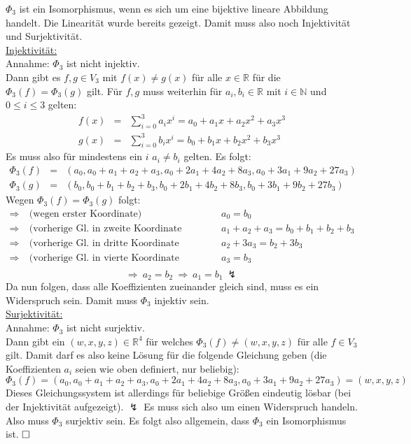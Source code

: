 \documentclass[10pt, a4paper]{article}
\begin{document}
		$\Phi_3$ ist ein Isomorphismus, wenn es sich um eine bijektive lineare Abbildung handelt. Die Linearität wurde bereits gezeigt. Damit muss also noch Injektivität und Surjektivität.\\

		\underline{Injektivität:}\\
		Annahme: $\Phi_3$ ist nicht injektiv.\\
		Dann gibt es $f,g \in V_3$ mit $f(x)\neq g(x)$ für alle $x\in \mathbb{R}$ für die $\Phi_3(f)=\Phi_3(g)$ gilt. Für $f,g$ muss weiterhin für $a_i,b_i \in \mathbb{R}$ mit $i \in \mathbb{N}$ und $0\leq i \leq 3$ gelten:
		\begin{eqnarray*}
			f(x) &=& \sum_{i=0}^3 a_ix^i = a_0 +a_1x +a_2x^2 + a_3x^3 \\	
			g(x) &=& \sum_{i=0}^3 b_ix^i = b_0 +b_1x +b_2x^2 + b_3x^3 
		\end{eqnarray*}
		Es muss also für mindestens ein $i$ $a_i\neq b_i$ gelten. Es folgt:
		\begin{eqnarray*}
			\Phi_3(f) &=& (a_0, a_0+a_1+a_2+a_3, a_0+2a_1+4a_2+8a_3, a_0+3a_1+9a_2+27a_3) \\
			\Phi_3(g) &=& (b_0, b_0+b_1+b_2+b_3, b_0+2b_1+4b_2+8b_3, b_0+3b_1+9b_2+27b_3) 			
		\end{eqnarray*}
		Wegen $\Phi_3(f)=\Phi_3(g)$ folgt:
		\begin{eqnarray*}
			\Rightarrow \ &\text{(wegen erster Koordinate)} & a_0 = b_0 \\
			\Rightarrow \ &\text{(vorherige Gl. in zweite Koordinate eingesetzt)} & a_1+a_2+a_3 = b_0+b_1+b_2+b_3 \\
			\Rightarrow \ &\text{(vorherige Gl. in dritte Koordinate eingesetzt)} & a_2 + 3a_3 = b_2 + 3b_3 \\
			\Rightarrow \ &\text{(vorherige Gl. in vierte Koordinate eingesetzt)} & a_3 = b_3 \\
		\end{eqnarray*}
		\[
			\Rightarrow \ a_2 = b_2 \ \Rightarrow \ a_1 = b_1 \ \lightning
		\]
		Da nun folgen, dass alle Koeffizienten zueinander gleich sind, muss es ein Widerspruch sein. Damit muss $\Phi_3$ injektiv sein.\\

		\underline{Surjektivität:}\\
		Annahme: $\Phi_3$ ist nicht surjektiv.\\
		Dann gibt ein $(w,x,y,z)\in \mathbb{R}^4$ für welches $\Phi_3(f) \neq (w,x,y,z)$ für alle $f \in V_3$ gilt. Damit darf es also keine Lösung für die folgende Gleichung geben (die Koeffizienten $a_i$ seien wie oben definiert, nur beliebig):
		\[
			\Phi_3(f) = (a_0, a_0+a_1+a_2+a_3, a_0+2a_1+4a_2+8a_3, a_0+3a_1+9a_2+27a_3) = (w,x,y,z)
		\]
		Dieses Gleichungssystem ist allerdings für beliebige Größen eindeutig lösbar (bei der Injektivität aufgezeigt). $\lightning$ Es muss sich also um einen Widerspruch handeln. Also muss $\Phi_3$ surjektiv sein. Es folgt also allgemein, dass $\Phi_3$ ein Isomorphismus ist. $\hfill\Box$


	
\end{document}
